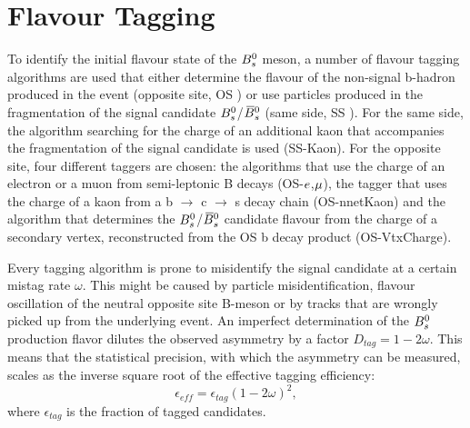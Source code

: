 \clearpage
\section{Flavour Tagging}
\label{sec:Tagging}

To identify the initial flavour state of the ${{B}^0_{s}}$ meson,
a number of flavour tagging algorithms are used that either determine the flavour of the non-signal b-hadron produced in the event (opposite site, OS \cite{LHCb-PAPER-2011-027})
or use particles produced in the fragmentation of the signal candidate ${{B}^0_{s}}$/${{\kern 0.18em\overline{\kern -0.18em B}{}}{}^0_{s}}$ (same side, SS \cite{Aaij:2016psi}). 
For the same side, the algorithm searching for the charge of an additional kaon that accompanies the fragmentation of the signal candidate is used (SS-Kaon). 
For the opposite site, four different taggers are chosen: 
the algorithms that use the charge of an electron or a muon from semi-leptonic B decays (OS-${e}$,${\mu}$), the tagger that uses the charge of a kaon from a b $\to$ c $\to$ s decay chain (OS-nnetKaon) 
and the algorithm that determines the ${{B}^0_{s}}$/${{\kern 0.18em\overline{\kern -0.18em B}{}}{}^0_{s}}$ candidate flavour from the charge of a secondary vertex, reconstructed from the OS b decay product (OS-VtxCharge). 

Every tagging algorithm is prone to misidentify the signal candidate at a certain mistag rate $\omega$. %
This might be caused by particle misidentification, flavour oscillation of the neutral opposite site B-meson or by tracks that are wrongly picked up from the underlying event. 
An imperfect determination of the ${{B}^0_{s}}$ production 
flavor dilutes the observed \CP asymmetry by a factor $D_{tag} = 1 - 2\omega$.
This means that the statistical precision, with which the \CP asymmetry can be measured, scales as the inverse square root of the effective tagging efficiency:
\begin{equation}
\label{eq: taggingEfficiency}
\epsilon_{eff} = \epsilon_{tag}(1 - 2\omega)^{2},
\end{equation}
where $\epsilon_{tag}$ is the fraction of tagged candidates. 

